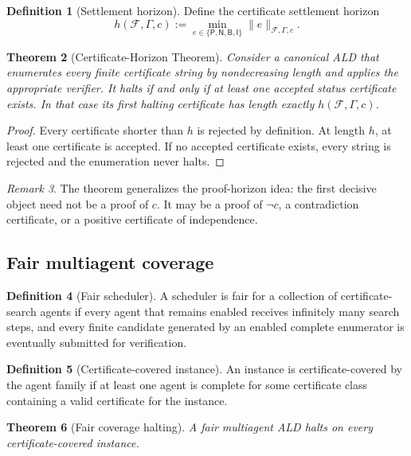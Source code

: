 \documentclass[11pt]{article}
\newtheorem{theorem}{Theorem}[section]
\theoremstyle{definition}
\newtheorem{definition}[theorem]{Definition}
\theoremstyle{remark}
\newtheorem{remark}[theorem]{Remark}
\newcommand{\Plus}{\mathsf{P}}
\newcommand{\Minus}{\mathsf{N}}
\newcommand{\BotEv}{\mathsf{B}}
\newcommand{\IndEv}{\mathsf{I}}
\newcommand{\F}{\mathcal F}
\newcommand{\Gammaa}{\Gamma}
\begin{document}
\begin{definition}[Settlement horizon]
Define the certificate settlement horizon
\[
h(\F,\Gammaa,c):=
\min_{e\in\{\Plus,\Minus,\BotEv,\IndEv\}}\|e\|_{\F,\Gammaa,c}.
\]
\end{definition}

\begin{theorem}[Certificate-Horizon Theorem]
Consider a canonical ALD that enumerates every finite certificate string by nondecreasing length and applies the appropriate verifier. It halts if and only if at least one accepted status certificate exists. In that case its first halting certificate has length exactly $h(\F,\Gammaa,c)$.
\end{theorem}

\begin{proof}
Every certificate shorter than $h$ is rejected by definition. At length $h$, at least one certificate is accepted. If no accepted certificate exists, every string is rejected and the enumeration never halts.
\end{proof}

\begin{remark}
The theorem generalizes the proof-horizon idea: the first decisive object need not be a proof of $c$. It may be a proof of $\neg c$, a contradiction certificate, or a positive certificate of independence.
\end{remark}

\subsection{Fair multiagent coverage}
\begin{definition}[Fair scheduler]
A scheduler is fair for a collection of certificate-search agents if every agent that remains enabled receives infinitely many search steps, and every finite candidate generated by an enabled complete enumerator is eventually submitted for verification.
\end{definition}

\begin{definition}[Certificate-covered instance]
An instance is certificate-covered by the agent family if at least one agent is complete for some certificate class containing a valid certificate for the instance.
\end{definition}

\begin{theorem}[Fair coverage halting]
A fair multiagent ALD halts on every certificate-covered instance.
\end{theorem}
\end{document}
